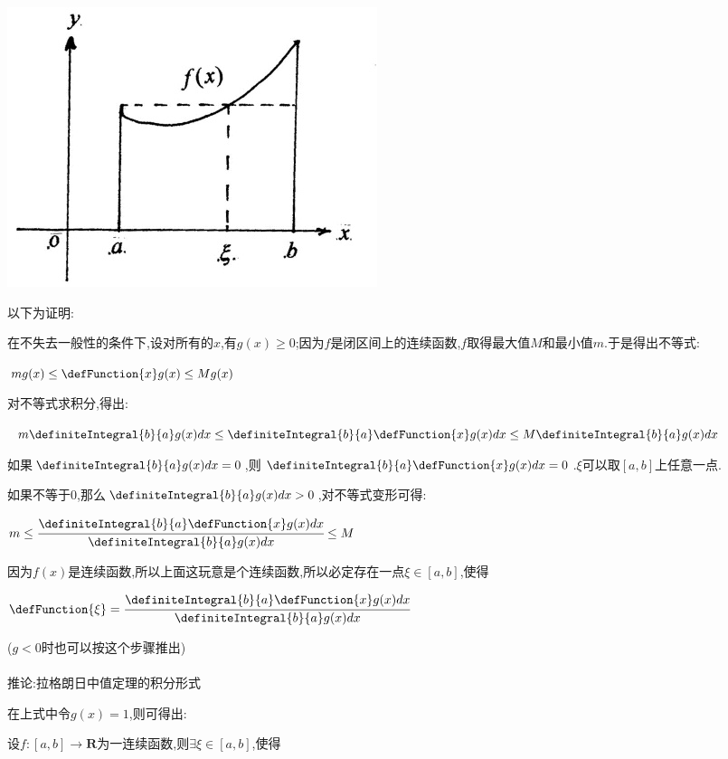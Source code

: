 {{{{\begin{center}
  \includegraphics{resources/Geometric_explanation_of_the_mean_value_theorem_for_integration.jpg}
\end{center}

以下为证明:

在不失去一般性的条件下,设对所有的$x$,有$g(x) \geq 0$;因为$f$是闭区间上的连续函数,$f$取得最大值$M$和最小值$m$.于是得出不等式:

$mg(x) \leq \defFunction{x}g(x) \leq Mg(x)$

对不等式求积分,得出:

$m\definiteIntegral{b}{a}g(x)dx \leq \definiteIntegral{b}{a}\defFunction{x}g(x)dx \leq M\definiteIntegral{b}{a}g(x)dx$

如果$\definiteIntegral{b}{a}g(x)dx = 0$,则$\definiteIntegral{b}{a}\defFunction{x}g(x)dx = 0$.$\xi$可以取$[a,b]$上任意一点.

如果不等于$0$,那么$\definiteIntegral{b}{a}g(x)dx>0$,对不等式变形可得:

$m \leq \cfrac{\definiteIntegral{b}{a}\defFunction{x}g(x)dx}{\definiteIntegral{b}{a}g(x)dx} \leq M$

因为$f(x)$是连续函数,所以上面这玩意是个连续函数,所以必定存在一点$\xi\in[a,b]$,使得

$\defFunction{\xi} = \cfrac{\definiteIntegral{b}{a}\defFunction{x}g(x)dx}{\definiteIntegral{b}{a}g(x)dx}$

($g<0$时也可以按这个步骤推出)
\\\\
推论:拉格朗日中值定理的积分形式

在上式中令$g(x) = 1$,则可得出:

设$f : [a,b] \to \mathbf{R}$为一连续函数,则$\exists\xi\in[a,b]$,使得

}}}}
